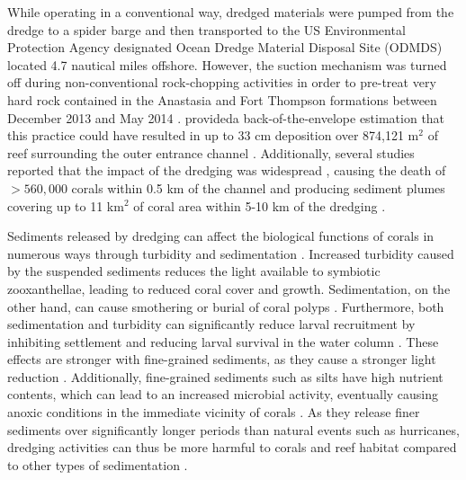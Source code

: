 While operating in a conventional way, dredged materials were pumped from the dredge to a spider barge and then transported to the US Environmental Protection Agency designated Ocean Dredge Material Disposal Site (ODMDS) located 4.7 nautical miles offshore. However, the suction mechanism was turned off during non-conventional rock-chopping activities in order to pre-treat very hard rock contained in the Anastasia and Fort Thompson formations between December 2013 and May 2014 \citep{miller2016detecting}. \citep{usace2017} provideda back-of-the-envelope estimation that this practice could have resulted in up to 33 cm deposition over 874,121 m$^2$ of reef surrounding the outer entrance channel . Additionally, several studies reported that the impact of the dredging was widespread \citep{miller2016detecting}, causing the death of  $> 560,000$ corals within 0.5 km of the channel \citep{cunning2019extensive} and producing sediment plumes covering up to 11 km$^2$ of coral area within 5-10 km of the dredging \citep{barnes2015sediment}.

Sediments released by dredging can affect the biological functions of corals in numerous ways  through turbidity and sedimentation \citep{erftemeijer2012environmental, jones2015effects}. Increased turbidity caused by the suspended sediments reduces the light available to symbiotic zooxanthellae, leading to reduced coral cover and growth. Sedimentation, on the other hand, can cause smothering or burial of coral polyps \citep{erftemeijer2012environmental}. Furthermore, both sedimentation and turbidity can significantly reduce larval recruitment by inhibiting settlement and reducing larval survival in the water column \citep{jones2015effects}. These effects are stronger with fine-grained sediments, as they cause a stronger light reduction \citep{fourney2017additive}. Additionally, fine-grained sediments such as silts have high nutrient contents, which can lead to an increased microbial activity, eventually causing anoxic conditions in the immediate vicinity of corals \citep{weber2012mechanisms}. As they release finer sediments over significantly longer periods than natural events such as hurricanes, dredging activities can thus be more harmful to corals and reef habitat compared to other types of sedimentation \citep{cunning2019extensive}.

